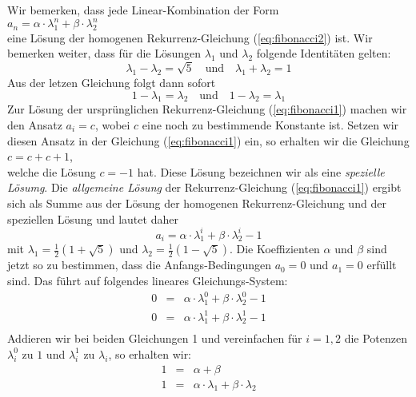 Wir bemerken, dass jede Linear-Kombination der Form
\\[0.2cm]
\hspace*{1.3cm}
$a_n = \alpha \cdot \lambda_1^n + \beta \cdot \lambda_2^n$
\\[0.2cm]
eine Lösung der homogenen Rekurrenz-Gleichung (\ref{eq:fibonacci2}) ist.
Wir bemerken weiter, dass für die Lösungen $\lambda_1$ und $\lambda_2$ folgende
Identitäten gelten:
\begin{equation}
  \label{eq:fibonacci3}
   \lambda_1 - \lambda_2 = \sqrt{5} \quad \mbox{und} \quad \lambda_1 + \lambda_2 = 1
\end{equation}
Aus der letzen Gleichung folgt dann sofort 
\begin{equation}
  \label{eq:fibonacci4}
  1 - \lambda_1 = \lambda_2 \quad \mbox{und} \quad 1 - \lambda_2 = \lambda_1 
\end{equation}
Zur Lösung der ursprünglichen Rekurrenz-Gleichung (\ref{eq:fibonacci1}) machen wir den Ansatz 
$a_i = c$, wobei $c$ eine noch zu bestimmende Konstante ist.  
Setzen wir diesen Ansatz in der Gleichung (\ref{eq:fibonacci1}) ein, so
erhalten wir die Gleichung \\[0.2cm] 
\hspace*{1.3cm} $c = c + c + 1$, \\[0.2cm]
welche die Lösung $c = -1$ hat.  Diese Lösung bezeichnen wir als eine \emph{spezielle Lösumg}.
Die \emph{allgemeine Lösung} der Rekurrenz-Gleichung (\ref{eq:fibonacci1})
ergibt sich als Summe aus der Lösung der homogenen Rekurrenz-Gleichung und der speziellen
Lösung und lautet daher 
\[ a_i = \alpha \cdot \lambda_1^i + \beta \cdot \lambda_2^i - 1 \]
mit $\lambda_1 = \frac{1}{2} (1 + \sqrt{5})$ und $\lambda_2 = \frac{1}{2} (1 - \sqrt{5})$.
Die Koeffizienten $\alpha$ und $\beta$ sind jetzt so zu bestimmen, dass die
Anfangs-Bedingungen $a_0 = 0$ und $a_1 = 0$ erfüllt sind.  Das führt auf folgendes
lineares Gleichungs-System: 
\[\begin{array}{lcl}
    0 & = & \alpha \cdot \lambda_1^0 + \beta \cdot \lambda_2^0 - 1 \\[0.2cm]
    0 & = & \alpha \cdot \lambda_1^1 + \beta \cdot \lambda_2^1 - 1 \\
  \end{array}
\]
Addieren wir bei beiden Gleichungen 1 und vereinfachen für $i=1,2$ die Potenzen $\lambda_i^0$ zu $1$ und
$\lambda_i^1$ zu $\lambda_i$, so erhalten wir:
\[\begin{array}{lcl}
    1 & = & \alpha + \beta \\[0.2cm]
    1 & = & \alpha \cdot \lambda_1 + \beta \cdot \lambda_2  \\
  \end{array}
\]
